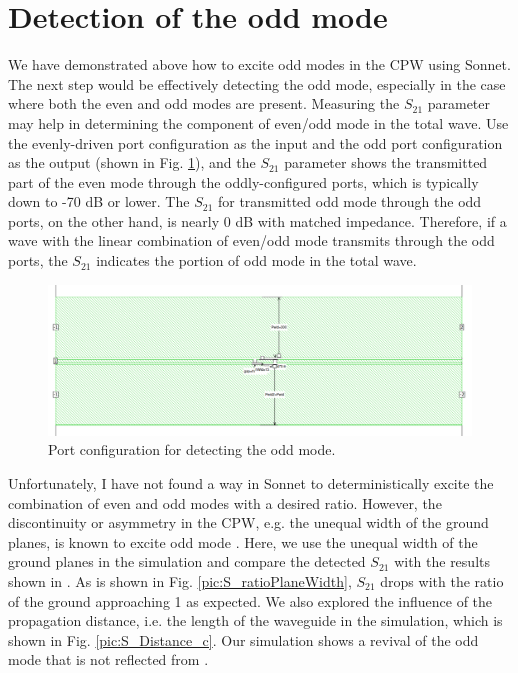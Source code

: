 \documentclass[noshowpacs,amsmath,
superscriptaddress,
10pt]{article}
\begin{document}
\section{Detection of the odd mode}

We have demonstrated above how to excite odd modes in the CPW using Sonnet. The next step would be effectively detecting the odd mode, especially in the case where both the even and odd modes are present. Measuring the $S_{21}$ parameter may help in determining the component of even/odd mode in the total wave. Use the evenly-driven port configuration as the input and the odd port configuration as the output (shown in Fig. \ref{pic:Detection_conf}), and the $S_{21}$ parameter shows the transmitted part of the even mode through the oddly-configured ports, which is typically down to -70 dB or lower. The $S_{21}$ for transmitted odd mode through the odd ports, on the other hand, is nearly 0 dB with matched impedance. Therefore, if a wave with the linear combination of even/odd mode transmits through the odd ports, the $S_{21}$ indicates the portion of odd mode in the total wave. 

\begin{figure}[!ht]
\centering
\includegraphics[width=16cm] {Detection_conf}
\caption{Port configuration for detecting the odd mode.}
\label{pic:Detection_conf}
\end{figure}

Unfortunately, I have not found a way in Sonnet to deterministically excite the combination of even and odd modes with a desired ratio. However, the discontinuity or asymmetry in the CPW, e.g. the unequal width of the ground planes, is known to excite odd mode \cite{ponchak2005excitation}. Here, we use the unequal width of the ground planes in the simulation and compare the detected $S_{21}$ with the results shown in \cite{ponchak2005excitation}. As is shown in Fig. \ref{pic:S_ratioPlaneWidth}, $S_{21}$ drops with the ratio of the ground approaching 1 as expected. We also explored the influence of the propagation distance,  i.e. the length of the waveguide in the simulation, which is shown in Fig. \ref{pic:S_Distance_c}. Our simulation shows a revival of the odd mode that is not reflected from \cite{ponchak2005excitation}.
\end{document}
